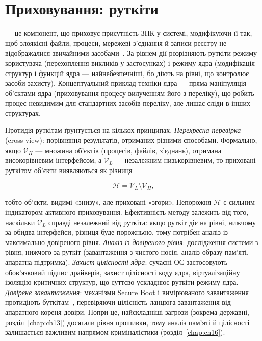\section{Приховування: руткіти}\label{sec:ch05-rootkits}

 --- це компонент, що приховує присутність ЗПК у системі, модифікуючи її так, щоб злоякісні файли, процеси, мережеві з'єднання й записи реєстру не відображалися звичайними засобами~\cite{ch05:hoglund,ch05:blunden}. За рівнем дії розрізняють руткіти режиму користувача (перехоплення викликів у застосунках) і режиму ядра (модифікація структур і функцій ядра --- найнебезпечніші, бо діють на рівні, що контролює засоби захисту). Концептуальний приклад техніки ядра --- пряма маніпуляція об'єктами ядра (приховування процесу вилученням його з переліку), що робить процес невидимим для стандартних засобів переліку, але лишає сліди в інших структурах.

Протидія руткітам ґрунтується на кількох принципах. \emph{Перехресна перевірка} (cross-view): порівняння результатів, отриманих різними способами. Формально, якщо $\mathcal{V}_H$ --- множина об'єктів (процесів, файлів, з'єднань), отримана високорівневим інтерфейсом, а $\mathcal{V}_L$ --- незалежним низькорівневим, то приховані руткітом об'єкти виявляються як різниця

\begin{equation}
\mathcal{H} = \mathcal{V}_L \setminus \mathcal{V}_H,
\label{eq:ch05-crossview}
\end{equation}

тобто об'єкти, видимі «знизу», але приховані «згори». Непорожня $\mathcal{H}$ є сильним індикатором активного приховування. Ефективність методу залежить від того, наскільки $\mathcal{V}_L$ справді незалежний від руткіта: якщо руткіт діє на рівні, нижчому за обидва інтерфейси, різниця буде порожньою, тому потрібен аналіз із максимально довіреного рівня. \emph{Аналіз із довіреного рівня}: дослідження системи з рівня, нижчого за руткіт (завантаження з чистого носія, аналіз образу пам'яті, апаратна підтримка). \emph{Захист цілісності ядра}: сучасні ОС застосовують обов'язковий підпис драйверів, захист цілісності коду ядра, віртуалізаційну ізоляцію критичних структур, що суттєво ускладнює руткіти режиму ядра. \emph{Довірене завантаження}: механізми Secure Boot і вимірюваного завантаження протидіють буткітам~\cite{ch05:matrosov}, перевіряючи цілісність ланцюга завантаження від апаратного кореня довіри. Попри це, найскладніші загрози (зокрема державні, розділ~\ref{chap:ch13}) досягали рівня прошивки, тому аналіз пам'яті й цілісності залишається важливим напрямом криміналістики (розділ~\ref{chap:ch16}).


